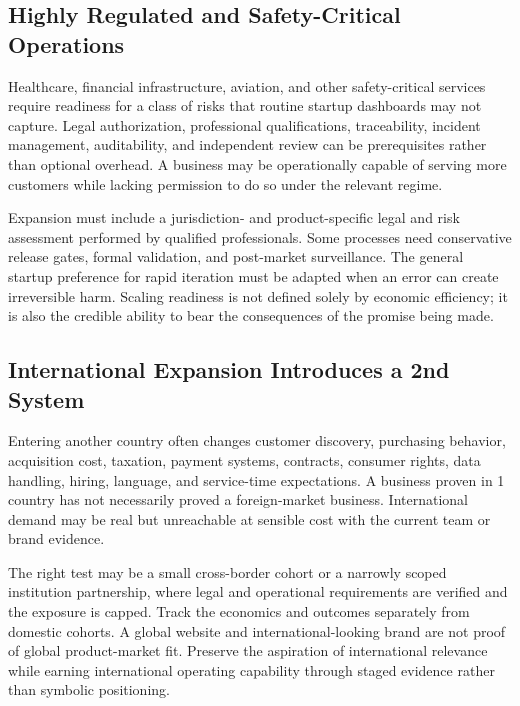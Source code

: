 \subsection{Highly Regulated and Safety-Critical Operations}
\label{sec:regulated_safety_critical_operations}

Healthcare, financial infrastructure, aviation, and other safety-critical services require readiness for a class of risks that routine startup dashboards may not capture. Legal authorization, professional qualifications, traceability, incident management, auditability, and independent review can be prerequisites rather than optional overhead. A business may be operationally capable of serving more customers while lacking permission to do so under the relevant regime.

Expansion must include a jurisdiction- and product-specific legal and risk assessment performed by qualified professionals. Some processes need conservative release gates, formal validation, and post-market surveillance. The general startup preference for rapid iteration must be adapted when an error can create irreversible harm. Scaling readiness is not defined solely by economic efficiency; it is also the credible ability to bear the consequences of the promise being made.

\subsection{International Expansion Introduces a 2nd System}
\label{sec:international_expansion_second_system}

Entering another country often changes customer discovery, purchasing behavior, acquisition cost, taxation, payment systems, contracts, consumer rights, data handling, hiring, language, and service-time expectations. A business proven in 1 country has not necessarily proved a foreign-market business. International demand may be real but unreachable at sensible cost with the current team or brand evidence.

The right test may be a small cross-border cohort or a narrowly scoped institution partnership, where legal and operational requirements are verified and the exposure is capped. Track the economics and outcomes separately from domestic cohorts. A global website and international-looking brand are not proof of global product-market fit. Preserve the aspiration of international relevance while earning international operating capability through staged evidence rather than symbolic positioning.
